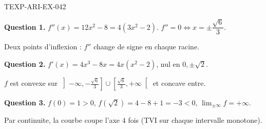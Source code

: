 \begin{corrige}{TEXP-ARI-EX-042}

\textbf{Question 1.} $f''(x) = 12x^2 - 8 = 4(3x^2-2)$. $f'' = 0 \iff x = \pm\dfrac{\sqrt{6}}{3}$.


Deux points d'inflexion : $f''$ change de signe en chaque racine.

\textbf{Question 2.} $f'(x) = 4x^3 - 8x = 4x(x^2-2)$, nul en $0, \pm\sqrt{2}$.

$f$ est convexe sur $\left]-\infty, -\frac{\sqrt6}{3}\right] \cup \left[\frac{\sqrt6}{3}, +\infty\right[$ et concave entre.

\textbf{Question 3.} $f(0)=1>0$, $f(\sqrt2) = 4-8+1 = -3 < 0$, $\lim_{\pm\infty} f = +\infty$.

Par continuite, la courbe coupe l'axe $4$ fois (TVI sur chaque intervalle monotone).

\end{corrige}
